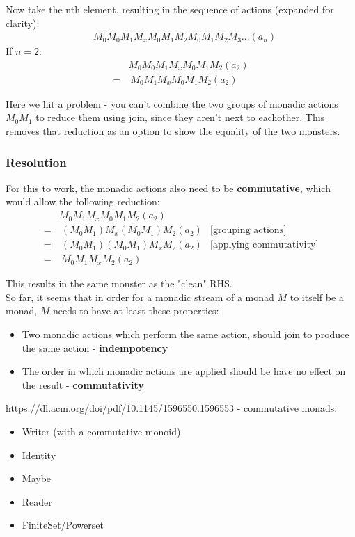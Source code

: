 \documentclass{article}
\begin{document}
Now take the nth element, resulting in the sequence of actions (expanded for clarity):
\begin{align*}
& M_0M_0M_1M_xM_0M_1M_2M_0M_1M_2M_3... (a_n)
\end{align*}
If $n = 2$:
\begin{align*}
& M_0M_0M_1M_xM_0M_1M_2 (a_2)\\
=&\ M_0M_1M_xM_0M_1M_2 (a_2)
\end{align*}

Here we hit a problem - you can't combine the two groups of monadic actions $M_0M_1$ to reduce them using join, since they aren't next to eachother. This removes that reduction as an option to show the equality of the two monsters. \\

\subsubsection{Resolution}

For this to work, the monadic actions also need to be \textbf{commutative}, which would allow the following reduction:
\begin{align*}
& M_0M_1M_xM_0M_1M_2 (a_2)\\
=&\ (M_0M_1)M_x(M_0M_1)M_2 (a_2) &\text{[grouping actions]}\\
=&\ (M_0M_1)(M_0M_1)M_xM_2 (a_2) &\text{[applying commutativity]}\\
=&\ M_0M_1M_xM_2 (a_2)
\end{align*}

This results in the same monster as the "clean" RHS.\\

So far, it seems that in order for a monadic stream of a monad $M$ to itself be a monad, $M$ needs to have at least these properties:
\begin{itemize}
	\item Two monadic actions which perform the same action, should join to produce the same action - \textbf{indempotency}
	\item The order in which monadic actions are applied should be have no effect on the result - \textbf{commutativity} 
\end{itemize}

https://dl.acm.org/doi/pdf/10.1145/1596550.1596553 - commutative monads:
\begin{itemize}
	\item Writer (with a commutative monoid)
	\item Identity
	\item Maybe
	\item Reader
	\item FiniteSet/Powerset
\end{itemize}
\end{document}
